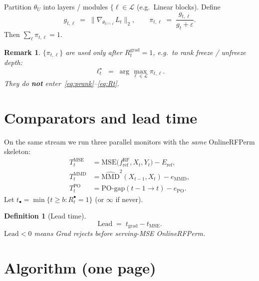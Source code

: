 \documentclass[11pt]{article}
\newtheorem{definition}{Definition}
\newtheorem{remark}{Remark}
\begin{document}
Partition $\theta_U$ into layers / modules $\{\ell\in\mathcal{L}$
(e.g.\ Linear blocks). Define
\begin{equation}
\label{eq:gl}
  g_{t,\ell}
  \;=\;
  \bigl\| \nabla_{\theta_{U\cap\ell}} L_t \bigr\|_2,
  \qquad
  \pi_{t,\ell}
  \;=\;
  \frac{g_{t,\ell}}{g_t+\varepsilon}.
\end{equation}
Then $\sum_{\ell}\pi_{t,\ell}=1$.

\begin{remark}
$\{\pi_{t,\ell}\}$ are used \emph{only after} $R_t^{\mathrm{grad}}=1$,
e.g.\ to rank freeze / unfreeze depth:
\begin{equation}
  \ell^\star_t
  \;=\;
  \arg\max_{\ell\in\mathcal{L}} \pi_{t,\ell}.
\end{equation}
They do \textbf{not} enter~\eqref{eq:prank}--\eqref{eq:Rt}.
\end{remark}

\section{Comparators and lead time}
\label{sec:lead}

On the same stream we run three parallel monitors with the \emph{same}
OnlineRFPerm skeleton:
\begin{align}
  T_t^{\mathrm{MSE}}
  &=
  \mathrm{MSE}\bigl(f_{\mathrm{ref}}^{\mathrm{RF}},X_t,Y_t\bigr)
  - E_{\mathrm{ref}},
  \label{eq:mse}\\[0.25em]
  T_t^{\mathrm{MMD}}
  &=
  \widehat{\mathrm{MMD}}^2(X_{t-1},X_t)
  - e_{\mathrm{MMD}},
  \label{eq:mmd}\\[0.25em]
  T_t^{\mathrm{PO}}
  &=
  \mathrm{PO\text{-}gap}(t-1\!\to\! t)
  - e_{\mathrm{PO}}.
  \label{eq:po}
\end{align}
Let $t_{\bullet}=\min\{t\ge b: R_t^{\bullet}=1\}$ (or $\infty$ if never).
\begin{definition}[Lead time]
\begin{equation}
\label{eq:lead}
  \mathrm{Lead}
  \;=\;
  t_{\mathrm{grad}} - t_{\mathrm{MSE}}.
\end{equation}
$\mathrm{Lead}<0$ means Grad rejects \emph{before} serving-MSE OnlineRFPerm.
\end{definition}

\section{Algorithm (one page)}
\label{sec:algo}
\end{document}
